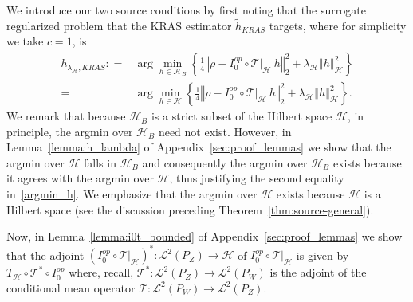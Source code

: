 \documentclass[twoside,11pt]{article}
\newcommand{\mc}{\mathcal}
\begin{document}
We introduce our two source conditions by first noting that the surrogate regularized problem that the KRAS estimator $\tilde h_{KRAS}$ targets,  where for simplicity we take $c=1$, is 
    \begin{align}
h_{\lambda_{\mc{H}},KRAS}^\dag
: =&\arg\min_{h\in\mc{H}_B}\left\{\frac{1}{4}\left\Vert\rho- I_0^{op} \circ \mc{T}\vert_\mc{H} \:h\right\Vert_2^2+\lambda_{\mc{H}}\left\Vert h\right\Vert_{\mc{H}}^2\right\}\nonumber\\
 =&\arg\min_{h\in\mc{H}}\left\{\frac{1}{4}\left\Vert\rho- I_0^{op} \circ \mc{T}\vert_\mc{H} \:h\right\Vert_2^2+\lambda_{\mc{H}}\left\Vert h\right\Vert_{\mc{H}}^2\right\}.
\label{argmin_h}
    \end{align}    
We remark that because $\mc{H}_B$ is a strict subset of the Hilbert space $\mc{H}$, in principle, the argmin over $\mc{H}_B$ need not exist. However, in Lemma~\ref{lemma:h_lambda} of Appendix~\ref{sec:proof_lemmas} we show that the argmin over $\mc{H}$ falls in $\mc{H}_B$ and consequently the argmin over $\mc{H}_B$ exists because it agrees with the argmin over $\mc{H}$, thus justifying the second equality in~\eqref{argmin_h}. We emphasize that the argmin over $\mc{H}$ exists because $\mc{H}$ is a Hilbert space (see the discussion preceding Theorem~\ref{thm:source-general}).  

Now, in Lemma~\ref{lemma:i0t_bounded} of Appendix~\ref{sec:proof_lemmas} we show that the adjoint $(I_0^{op}\circ \mc{T}\vert_\mc{H})^*:\mc{L}^2(P_Z) \rightarrow \mc{H}$ of $I_0^{op}\circ \mc{T}\vert_\mc{H}$ is given by $T_{\mc{H}} \circ\mc{\mc{T}}^* \circ I_0^{op}$ where, recall, $\mc{T}^*:\mc{L}^2(P_Z) \rightarrow \mc{L}^2(P_W)$ is the adjoint of the conditional mean operator $\mc{T}:\mc{L}^2(P_W) \rightarrow \mc{L}^2(P_Z)$.
\end{document}
